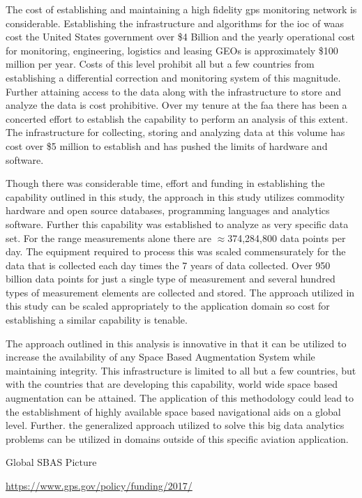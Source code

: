 The cost of establishing and maintaining a high fidelity \ac{gps} monitoring network is considerable. Establishing the infrastructure and algorithms for the \ac{ioc} of \ac{waas} cost the United States government over \$4 Billion and the yearly operational cost for monitoring, engineering, logistics and leasing GEOs is approximately \$100 million per year. Costs of this level prohibit all but a few countries from establishing a differential correction and monitoring system of this magnitude. Further attaining access to the data along with the infrastructure to store and analyze the data is cost prohibitive. Over my tenure at the \ac{faa} there has been a concerted effort to establish the capability to perform an analysis of this extent. The infrastructure for collecting, storing and analyzing data at this volume has cost over \$5 million to establish and has pushed the limits of hardware and software.

Though there was considerable time, effort and funding in establishing the capability outlined in this study, the approach in this study utilizes commodity hardware and open source databases, programming languages and analytics software. Further this capability was established to analyze as very specific data set. For the range measurements alone there are $\approx$374,284,800 data points per day.  The equipment required to process this was scaled commensurately for the data that is collected each day times the 7 years of data collected. Over 950 billion data points for just a single type of measurement and several hundred types of measurement elements are collected and stored. The approach utilized in this study can be scaled appropriately to the application domain so cost for establishing a similar capability is tenable.

The approach outlined in this analysis is innovative in that it can be utilized to increase the availability of any Space Based Augmentation System while maintaining integrity.  This infrastructure is limited to all but a few countries, but with the countries that are developing this capability, world wide space based augmentation can be attained. The application of this methodology could lead to the establishment of highly available space based navigational aids on a global level. Further. the generalized approach utilized to solve this big data analytics problems can be utilized in domains outside of this specific aviation application.

Global SBAS Picture

\href{https://www.gps.gov/policy/funding/2017/}{https://www.gps.gov/policy/funding/2017/}

